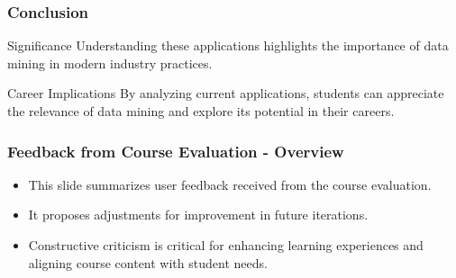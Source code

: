 \documentclass[aspectratio=169]{beamer}
\begin{document}
\begin{frame}[fragile]
    \frametitle{Conclusion}
    \begin{block}{Significance}
        Understanding these applications highlights the importance of data mining in modern industry practices.
    \end{block}
    \begin{block}{Career Implications}
        By analyzing current applications, students can appreciate the relevance of data mining and explore its potential in their careers.
    \end{block}
\end{frame}

\begin{frame}[fragile]
    \frametitle{Feedback from Course Evaluation - Overview}
    \begin{itemize}
        \item This slide summarizes user feedback received from the course evaluation.
        \item It proposes adjustments for improvement in future iterations.
        \item Constructive criticism is critical for enhancing learning experiences and aligning course content with student needs.
    \end{itemize}
\end{frame}
\end{document}
